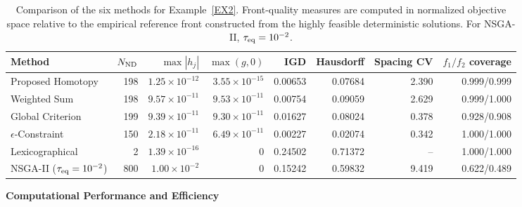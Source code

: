 \documentclass[11pt,pdflatex,sn-mathphys-ay]{sn-jnl}%
\theoremstyle{definition}
\theoremstyle{thmstyleone}%
\theoremstyle{thmstyletwo}%
\theoremstyle{thmstylethree}%
\begin{document}
	\begin{table}[htbp]
		\centering
		\caption{Comparison of the six methods for Example~\ref{EX2}.
			Front-quality measures are computed in normalized objective space
			relative to the empirical reference front constructed from the highly
			feasible deterministic solutions. For NSGA-II,
			$\tau_{\rm eq}=10^{-2}$.}
		\label{tab:example1_all_methods}
		\small
		\begin{tabular}{lrrrrrrr}
			\toprule
			Method
			& $N_{\rm ND}$
			& $\max |h_j|$
			& $\max(g,0)$
			& IGD
			& Hausdorff
			& Spacing CV
			& $f_1/f_2$ coverage \\
			\midrule
			Proposed Homotopy
			& 198 & $1.25{\times}10^{-12}$ & $3.55{\times}10^{-15}$
			& 0.00653 & 0.07684 & 2.390 & 0.999/0.999 \\
			
			Weighted Sum
			& 198 & $9.57{\times}10^{-11}$ & $9.53{\times}10^{-11}$
			& 0.00754 & 0.09059 & 2.629 & 0.999/1.000 \\
			
			Global Criterion
			& 199 & $9.39{\times}10^{-11}$ & $9.30{\times}10^{-11}$
			& 0.01627 & 0.08024 & 0.378 & 0.928/0.908 \\
			
			$\epsilon$-Constraint
			& 150 & $2.18{\times}10^{-11}$ & $6.49{\times}10^{-11}$
			& 0.00227 & 0.02074 & 0.342 & 1.000/1.000 \\
			
			Lexicographical
			& 2 & $1.39{\times}10^{-16}$ & $0$
			& 0.24502 & 0.71372 & -- & 1.000/1.000 \\
			
			NSGA-II ($\tau_{\rm eq}=10^{-2}$)
			& 800 & $1.00{\times}10^{-2}$ & $0$
			& 0.15242 & 0.59832 & 9.419 & 0.622/0.489 \\
			\bottomrule
		\end{tabular}
	\end{table}
	
	\medskip\noindent \textbf{Computational Performance and Efficiency}
	
\end{document}

